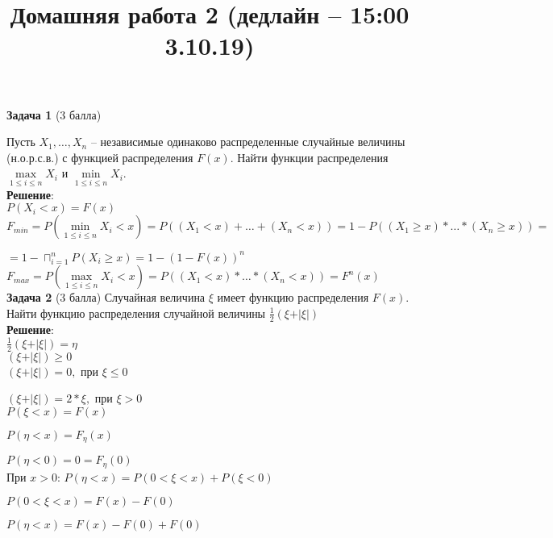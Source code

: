 \documentclass{article}
\title{Домашняя работа 2 (дедлайн -- 15:00 3.10.19)}
\begin{document}
\maketitle
\textbf{Задача 1} (3 балла)

Пусть $X_1, \dots, X_n$ -- независимые одинаково распределенные случайные 
величины (н.о.р.с.в.) с функцией распределения $F(x)$.
Найти функции распределения $\max\limits_{1 \leq i \leq n} X_i$ и $\min\limits_{1 \leq i 
\leq n} X_i$.\\

\textbf{Решение}:\\

$P(X_{i} < x) = F(x)$\\

$F_{min} = P(\min\limits_{1 \leq i \leq n} X_i < x) = P((X_1 < x) + \dots + (X_n < x)) = 1 - P((X_1 \geq x)*\dots *(X_n \geq x)) =$

$= 1 - \sqcap_{i = 1}^{n} P(X_i \geq x) = 1 - (1-F(x))^n$\\

$F_{max} = P(\max\limits_{1 \leq i \leq n} X_i < x) = P((X_1 < x)*\dots *(X_n < x)) = F^n(x)$\\


\textbf{Задача 2} (3 балла)
Случайная величина $\xi$ имеет функцию распределения $F(x)$. Найти функцию распределения случайной величины $\frac{1}{2}(\xi + \vert \xi \vert)$\\

\textbf{Решение}:\\

$\frac{1}{2}(\xi + \vert \xi \vert) = \eta$\\

$(\xi + \vert \xi \vert) \geq 0$\\

$(\xi + \vert \xi \vert) = 0,$ при $\xi \leq 0$

$(\xi + \vert \xi \vert) = 2*\xi,$ при $\xi > 0$\\

$P(\xi < x) = F(x)$

$P(\eta < x) = F_{\eta}(x)$

$P(\eta < 0) = 0 = F_{\eta}(0)$\\

При $x > 0$: $P(\eta < x) = P(0 < \xi < x) + P(\xi < 0)$

$P(0 < \xi < x) = F(x) - F(0)$

$P(\eta < x) = F(x) - F(0) + F(0)$\\
\end{document}
